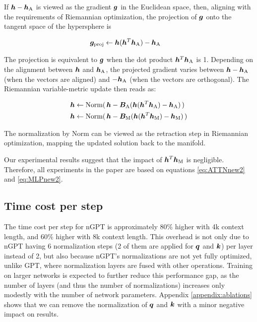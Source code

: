 \documentclass{article} %
\begin{document}
If ${\bm{h}}-{\bm{h}}_{\text{A}}$ is viewed as the gradient ${\bm{g}}$ in the Euclidean space, then, aligning with the requirements of Riemannian optimization, the projection of ${\bm{g}}$ onto the tangent space of the hypersphere is

\begin{align}
    {\bm{g}}_{\text{proj}} &\leftarrow {\bm{h}}({\bm{h}}^T{\bm{h}}_{\text{A}}) - {\bm{h}}_{\text{A}}  \label{eq:gproj}
\end{align}

The projection is equivalent to ${\bm{g}}$ when the dot product ${\bm{h}}^T{\bm{h}}_{\text{A}}$ is 1. Depending on the alignment between ${\bm{h}}$ and ${\bm{h}}_{\text{A}}$, the projected gradient varies between ${\bm{h}}-{\bm{h}}_{\text{A}}$ (when the vectors are aligned) and $-{\bm{h}}_{\text{A}}$ (when the vectors are orthogonal). The Riemannian variable-metric update then reads as: 

\begin{align}
    {\bm{h}} &\leftarrow \text{Norm}(\,{\bm{h}} - {\bm{B}}_{\text{A}}({\bm{h}}({\bm{h}}^T{\bm{h}}_{\text{A}}) - {\bm{h}}_{\text{A}})\,) \label{eq:ATTNnew3} \\ 
    {\bm{h}} &\leftarrow \text{Norm}(\,{\bm{h}} - {\bm{B}}_{\text{M}}({\bm{h}}({\bm{h}}^T{\bm{h}}_{\text{M}}) - {\bm{h}}_{\text{M}})\,)  \label{eq:MLPnew3}
\end{align}

The normalization by Norm can be viewed as the retraction step in Riemannian optimization, mapping the updated solution back to the manifold. 

Our experimental results suggest that the impact of ${\bm{h}}^T{\bm{h}}_{\text{M}}$ is negligible. Therefore, all experiments in the paper are based on equations \ref{eq:ATTNnew2} and \ref{eq:MLPnew2}.

\subsection{Time cost per step}
\label{appendix:timecost}

The time cost per step for nGPT is approximately 80\% higher with 4k context length, and 60\% higher with 8k context length. 
This overhead is not only due to nGPT having 6 normalization steps (2 of them are applied for ${\bm{q}}$ and ${\bm{k}}$) per layer instead of 2, but also because nGPT's normalizations are not yet fully optimized, unlike GPT, where normalization layers are fused with other operations. Training on larger networks is expected to further reduce this performance gap, as the number of layers (and thus the number of normalizations) increases only modestly with the number of network parameters.  
Appendix \ref{appendix:ablations} shows that we can remove the normalization of ${\bm{q}}$ and ${\bm{k}}$ with a minor negative impact on results. 
\end{document}
